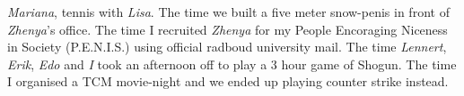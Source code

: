 \emph{Mariana}, tennis with \emph{Lisa}. The time we built a five meter snow-penis in front of \emph{Zhenya}'s office. The time I recruited \emph{Zhenya} for my People Encoraging Niceness in Society (P.E.N.I.S.) using official radboud university mail. The time \emph{Lennert}, \emph{Erik}, \emph{Edo} and \emph{I} took an afternoon off to play a 3 hour game of Shogun. The time I organised a TCM movie-night and we ended up playing counter strike instead. 


\endgroup
